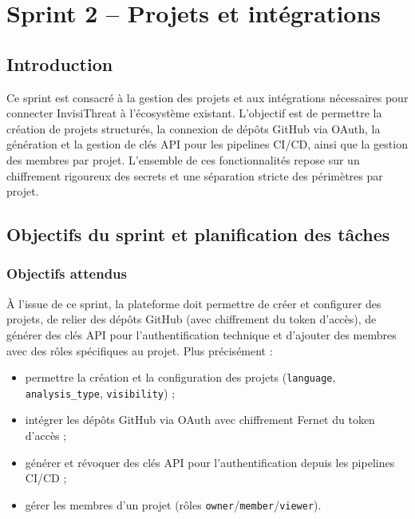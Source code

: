 \chapter{Sprint 2 -- Projets et intégrations}

\section{Introduction}
Ce sprint est consacré à la gestion des projets et aux intégrations nécessaires pour connecter InvisiThreat à l'écosystème existant. L'objectif est de permettre la création de projets structurés, la connexion de dépôts GitHub via OAuth, la génération et la gestion de clés API pour les pipelines CI/CD, ainsi que la gestion des membres par projet. L'ensemble de ces fonctionnalités repose sur un chiffrement rigoureux des secrets et une séparation stricte des périmètres par projet.

\section{Objectifs du sprint et planification des tâches}

\subsection{Objectifs attendus}
À l'issue de ce sprint, la plateforme doit permettre de créer et configurer des projets, de relier des dépôts GitHub (avec chiffrement du token d'accès), de générer des clés API pour l'authentification technique et d'ajouter des membres avec des rôles spécifiques au projet. Plus précisément :
\begin{itemize}
  \item permettre la création et la configuration des projets (\texttt{language}, \texttt{analysis\_type}, \texttt{visibility}) ;
  \item intégrer les dépôts GitHub via OAuth avec chiffrement Fernet du token d'accès ;
  \item générer et révoquer des clés API pour l'authentification depuis les pipelines CI/CD ;
  \item gérer les membres d'un projet (rôles \texttt{owner}/\texttt{member}/\texttt{viewer}).
\end{itemize}

